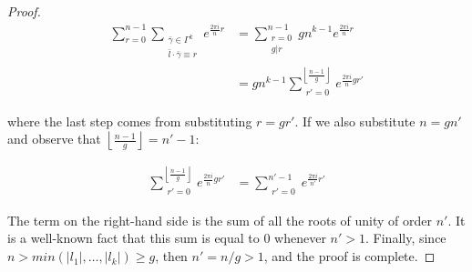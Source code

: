 \documentclass[11pt,a4paper]{tesis}
\theoremstyle{plain}
\theoremstyle{definition}
\begin{document}
\begin{proof}
  \begin{equation*}
    \begin{aligned}
      \sum_{r = 0}^{n - 1}
        \sum_{
          \substack{
            \bar{\gamma} \in \Gamma^k \\
            \bar{l} \cdot \bar{\gamma} \equiv r
          }
        } e^{\frac{2 \pi i}{n} r}
      & = \sum_{\substack{
        r = 0 \\
        g | r
      }}^{n - 1} g n^{k - 1} e^{\frac{2 \pi i}{n} r} \\
      & = g n^{k - 1} \sum_{\substack{
        r' = 0
      }}^{\left\lfloor \frac{n - 1}{g} \right\rfloor} e^{\frac{2 \pi i}{n} g r'}
    \end{aligned}
  \end{equation*}

  where the last step comes from substituting $r = g r'$. If we also substitute $n = g n'$ and observe that $\left\lfloor \frac{n - 1}{g} \right\rfloor = n' - 1$:

  \begin{equation*}
    \begin{aligned}
      \sum_{\substack{
        r' = 0
      }}^{\left\lfloor \frac{n - 1}{g} \right\rfloor} e^{\frac{2 \pi i}{n} g r'}
      & = \sum_{\substack{
        r' = 0
      }}^{n' - 1} e^{\frac{2 \pi i}{n'} r'}
    \end{aligned}
  \end{equation*}

  The term on the right-hand side is the sum of all the roots of unity of order $n'$. It is a well-known fact that this sum is equal to $0$ whenever $n' > 1$. Finally, since $n > min(|l_1|, \dots, |l_k|) \ge g$, then $n' = n / g > 1$, and the proof is complete.

\end{proof}
\end{document}
